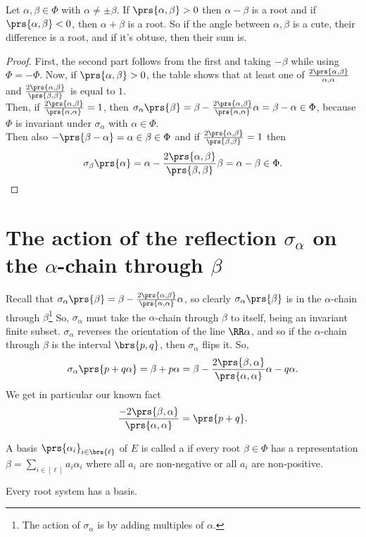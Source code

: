 \documentclass[10pt,a4paper,twoside,openany,hidelinks]{book}
\begin{document}
\begin{proposition}
Let $\alpha,\beta \in \Phi$ with $\alpha \neq \pm \beta$. If $\prs{\alpha,\beta} > 0$ then $\alpha-\beta$ is a root and if $\prs{\alpha,\beta} < 0$, then $\alpha+\beta$ is a root. So if the angle between $\alpha,\beta$ is a cute, their difference is a root, and if it's obtuse, then their sum is.
\end{proposition}
\begin{proof}
First, the second part follows from the first and taking $-\beta$ while using $\Phi = -\Phi$.
Now, if $\prs{\alpha,\beta} > 0$, the table shows that at least one of $\frac{2\prs{\alpha,\beta}}{\alpha,\alpha}$ and $\frac{2\prs{\alpha,\beta}}{\prs{\beta,\beta}}$ is equal to $1$.\\
Then, if $\frac{2\prs{\alpha,\beta}}{\prs{\alpha,\alpha}} = 1$, then
$\sigma_{\alpha}\prs{\beta} = \beta - \frac{2\prs{\alpha,\beta}}{\prs{\alpha,\alpha}} \alpha = \beta - \alpha \in \Phi$, because $\Phi$ is invariant under $\sigma_{\alpha}$ with $\alpha \in \Phi$.\\
Then also $-\prs{\beta - \alpha} = \alpha \in \beta \in \Phi$ and if
$\frac{2\prs{\alpha,\beta}}{\prs{\beta,\beta}} = 1$ then
\[\sigma_{\beta}\prs{\alpha} = \alpha - \frac{2\prs{\alpha,\beta}}{\prs{\beta,\beta}}\beta = \alpha - \beta \in \Phi \text{.}\]
\end{proof}

\section{The action of the reflection $\sigma_{\alpha}$ on the $\alpha$-chain through $\beta$}
Recall that $\sigma_{\alpha}\prs{\beta} = \beta - \frac{2\prs{\alpha,\beta}}{\prs{\alpha,\alpha}} \alpha$, so clearly $\sigma_{\alpha}\prs{\beta}$ is in the $\alpha$-chain through $\beta$\footnote{The action of $\sigma_{\alpha}$ is by adding multiples of $\alpha$.}
So, $\sigma_{\alpha}$ must take the $\alpha$-chain through $\beta$ to itself, being an invariant finite subset.
$\sigma_{\alpha}$ reverses the orientation of the line $\RR\alpha$, and so if the $\alpha$-chain through $\beta$ is the interval $\brs{p,q}$, then $\sigma_{\alpha}$ flips it. So,
\[\sigma_{\alpha} \prs{p+q\alpha} = \beta + p\alpha = \beta - \frac{2\prs{\beta,\alpha}}{\prs{\alpha,\alpha}} \alpha - q\alpha \text{.}\]
We get in particular our known fact
\[\frac{-2\prs{\beta,\alpha}}{\prs{\alpha,\alpha}} = \prs{p+q} \text{.}\]

\begin{definition}
A basis $\prs{\alpha_i}_{i \in \brs{\ell}}$ of $E$ is called a  if every root $\beta \in \Phi$ has a representation
$\beta = \sum_{i \in [\ell]} a_i \alpha_i$ where all $a_i$ are non-negative or all $a_i$ are non-positive.
\end{definition}
\begin{theorem}\label{root_system_basis:existence}
Every root system has a basis.
\end{theorem}
\end{document}
